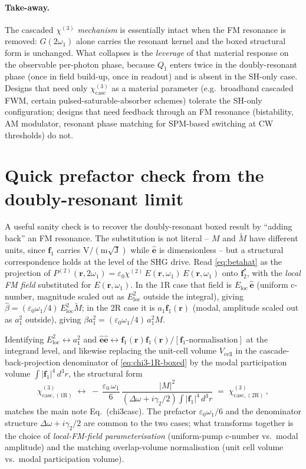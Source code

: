 \documentclass[11pt,a4paper]{article}
\newcommand{\eps}{\varepsilon}
\newcommand{\bvec}[1]{\mathbf{#1}}
\newcommand{\f}{\bvec{f}}
\newcommand{\ri}{\bvec{r}}
\newcommand{\dthreer}{\,d^{3}r}
\newcommand{\chitwo}{\chi^{(2)}}
\newcommand{\chithree}{\chi^{(3)}}
\newcommand{\Dom}{\Delta\omega}
\newcommand{\chicascOneR}{\chi^{(3)}_{\text{casc},(1\mathrm R)}}
\newcommand{\chicascTwoR}{\chi^{(3)}_{\text{casc},(2\mathrm R)}}
\newcommand{\Vunit}{V_{\text{cell}}}
\begin{document}
\paragraph{Take-away.}
The cascaded $\chithree$ \emph{mechanism} is essentially intact when the
FM resonance is removed: $G(2\omega_1)$ alone carries the resonant kernel
and the boxed structural form is unchanged.  What collapses is the
\emph{leverage} of that material response on the observable per-photon
phase, because $Q_1$ enters twice in the doubly-resonant phase
(once in field build-up, once in readout) and is absent in the SH-only
case.  Designs that need only $\chithree_\text{casc}$ as a material
parameter (e.g.\ broadband cascaded FWM, certain pulsed-saturable-absorber
schemes) tolerate the SH-only configuration; designs that need feedback
through an FM resonance (bistability, AM modulator, resonant phase
matching for SPM-based switching at CW thresholds) do not.

\appendix
\section{Quick prefactor check from the doubly-resonant limit}\label{app:check}

A useful sanity check is to recover the doubly-resonant boxed result by
``adding back'' an FM resonance.  The substitution is not literal --
$M$ and $\widetilde M$ have different units, since $\f_1$ carries
$\mathrm{V}/(\mathrm{m}\sqrt{\mathrm J})$ while $\hat{\bm e}$ is
dimensionless -- but a structural correspondence holds at the level of
the SHG drive.  Read \eqref{eq:betahat} as the projection of
$P^{(2)}(\ri,2\omega_1)=\eps_0\chitwo\,E(\ri,\omega_1)\,E(\ri,\omega_1)$
onto $\f_2^{*}$, with the \emph{local FM field} substituted for
$E(\ri,\omega_1)$.  In the 1R case that field is $E_\text{loc}\,\hat{\bm e}$
(uniform c-number, magnitude scaled out as $E_\text{loc}^{2}$ outside the
integral), giving $\hat\beta=(\eps_0\omega_1/4)\,E_\text{loc}^{2}\widetilde M$;
in the 2R case it is $a_1\f_1(\ri)$ (modal, amplitude scaled out as
$a_1^{2}$ outside), giving $\beta a_1^{2}=(\eps_0\omega_1/4)\,a_1^{2}M$.

Identifying $E_\text{loc}^{2}\leftrightarrow a_1^{2}$ and
$\hat{\bm e}\hat{\bm e}\leftrightarrow\f_1(\ri)\f_1(\ri)/[\f_1\text{-normalisation}]$
at the integrand level, and likewise replacing the unit-cell volume
$\Vunit$ in the cascade-back-projection denominator of
\eqref{eq:chi3-1R-boxed} by the modal participation volume
$\int|\f_1|^{4}\dthreer$, the structural form
\begin{equation*}
  \chicascOneR\;\longleftrightarrow\;
   -\,\frac{\eps_0\,\omega_1}{6}\,
   \frac{|M|^{2}}{(\Dom+i\gamma_2/2)\!\int\!|\f_1|^{4}\dthreer}
   \;=\;\chicascTwoR\,,
\end{equation*}
matches the main note Eq.~(chi3casc).  The prefactor $\eps_0\omega_1/6$
and the denominator structure $\Dom+i\gamma_2/2$ are common to the two
cases; what transforms together is the choice of \emph{local-FM-field
parameterisation} (uniform-pump c-number vs.\ modal amplitude) and the
matching overlap-volume normalisation (unit cell volume vs.\ modal
participation volume).
\end{document}
